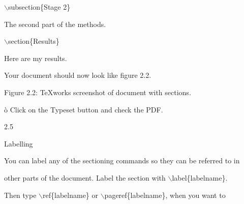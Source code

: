 \documentclass[a4paper,portrait,12pt]{article}
\begin{document}
\begin{flushleft}
\newpage
\ensuremath{\backslash}subsection\{Stage 2\}
\end{flushleft}


\begin{flushleft}
The second part of the methods.
\end{flushleft}


\begin{flushleft}
\ensuremath{\backslash}section\{Results\}
\end{flushleft}


\begin{flushleft}
Here are my results.
\end{flushleft}


\begin{flushleft}
Your document should now look like figure 2.2.
\end{flushleft}





\begin{flushleft}
Figure 2.2: TeXworks screenshot of document with sections.
\end{flushleft}





\begin{flushleft}
\`{o} Click on the Typeset button and check the PDF.
\end{flushleft}





2.5





\begin{flushleft}
Labelling
\end{flushleft}





\begin{flushleft}
You can label any of the sectioning commands so they can be referred to in
\end{flushleft}


\begin{flushleft}
other parts of the document. Label the section with \ensuremath{\backslash}label\{labelname\}.
\end{flushleft}


\begin{flushleft}
Then type \ensuremath{\backslash}ref\{labelname\} or \ensuremath{\backslash}pageref\{labelname\}, when you want to
\end{flushleft}
\end{document}
